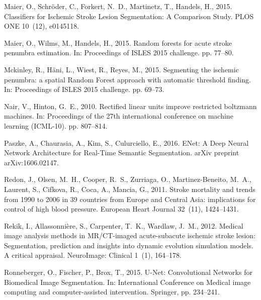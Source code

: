 \documentclass[letterpaper,final,authoryear,3p,times,twocolumn]{elsarticle}
\begin{document}
\begin{thebibliography}{36}
Maier, O., Schr{\"{o}}der, C., Forkert, N.~D., Martinetz, T., Handels, H.,
  2015{}. {Classifiers for Ischemic Stroke Lesion Segmentation: A
  Comparison Study}. PLOS ONE 10~(12), e0145118.

Maier, O., Wilms, M., Handels, H., 2015{}. {Random forests for
  acute stroke penumbra estimation}. In: Proceedings of ISLES 2015 challenge.
  pp. 77--80.

Mckinley, R., H{\"{a}}ni, L., Wiest, R., Reyes, M., 2015. {Segmenting the
  ischemic penumbra: a spatial Random Forest approach with automatic threshold
  finding}. In: Proceedings of ISLES 2015 challenge. pp. 69--73.

Nair, V., Hinton, G.~E., 2010. {Rectified linear units improve restricted
  boltzmann machines}. In: Proceedings of the 27th international conference on
  machine learning (ICML-10). pp. 807--814.

Paszke, A., Chaurasia, A., Kim, S., Culurciello, E., 2016. {ENet: A Deep Neural
  Network Architecture for Real-Time Semantic Segmentation}. arXiv preprint
  arXiv:1606.02147.

Redon, J., Olsen, M.~H., Cooper, R.~S., Zurriaga, O., Martinez-Beneito, M.~A.,
  Laurent, S., Cifkova, R., Coca, A., Mancia, G., 2011. {Stroke mortality and
  trends from 1990 to 2006 in 39 countries from Europe and Central Asia:
  implications for control of high blood pressure}. European Heart Journal
  32~(11), 1424--1431.

Rekik, I., Allassonni{\`{e}}re, S., Carpenter, T.~K., Wardlaw, J.~M., 2012.
  {Medical image analysis methods in MR/CT-imaged acute-subacute ischemic
  stroke lesion: Segmentation, prediction and insights into dynamic evolution
  simulation models. A critical appraisal}. NeuroImage: Clinical 1~(1),
  164--178.

Ronneberger, O., Fischer, P., Brox, T., 2015. {U-Net: Convolutional Networks
  for Biomedical Image Segmentation}. In: International Conference on Medical
  image computing and computer-assisted intervention. Springer, pp. 234--241.


\end{thebibliography}
\end{document}
